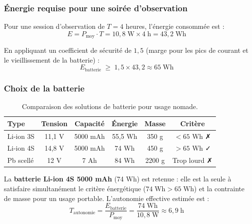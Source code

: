\documentclass[12pt,a4paper]{report}
\begin{document}
\begin{enumerate}
\subsubsection*{Énergie requise pour une soirée d'observation}

Pour une session d'observation de $T = 4$ heures, l'énergie consommée est :
\begin{equation}
    E = P_{\text{moy}} \cdot T = 10{,}8\;\text{W} \times 4\;\text{h}
    = 43{,}2\;\text{Wh}
\end{equation}

En appliquant un coefficient de sécurité de $1{,}5$ (marge pour les pics de
courant et le vieillissement de la batterie) :
\begin{equation}
    E_{\text{batterie}} \;\geq\; 1{,}5 \times 43{,}2 \approx 65\;\text{Wh}
\end{equation}

\subsubsection*{Choix de la batterie}

\begin{table}[H]
    \centering
    \caption{Comparaison des solutions de batterie pour usage nomade.}
    \begin{tabular}{|l|c|c|c|c|c|}
        \hline
        \textbf{Type} & \textbf{Tension} & \textbf{Capacité} & \textbf{Énergie}
        & \textbf{Masse} & \textbf{Critère} \\
        \hline
        Li-ion 3S & 11,1 V & 5000 mAh & 55,5 Wh & 350 g  & $<65$ Wh ✗ \\
        Li-ion 4S & 14,8 V & 5000 mAh & 74 Wh   & 450 g  & $>65$ Wh ✓ \\
        Pb scellé & 12 V   & 7 Ah     & 84 Wh   & 2200 g & Trop lourd ✗ \\
        \hline
    \end{tabular}
\end{table}

La \textbf{batterie Li-ion 4S 5000 mAh} (74 Wh) est retenue : elle est la seule
à satisfaire simultanément le critère énergétique ($74\;\text{Wh} > 65\;\text{Wh}$)
et la contrainte de masse pour un usage portable. L'autonomie effective estimée est :
\begin{equation}
    T_{\text{autonomie}} = \frac{E_{\text{batterie}}}{P_{\text{moy}}}
    = \frac{74\;\text{Wh}}{10{,}8\;\text{W}} \approx 6{,}9\;\text{h}
\end{equation}


\end{enumerate}
\end{document}
